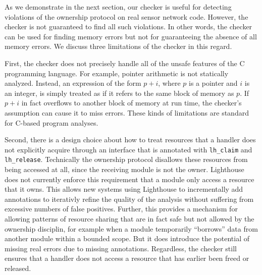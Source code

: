 As we demonstrate in the next section, our checker is useful for
detecting violations of the ownership protocol on real sensor network
code.  However, the checker is not guaranteed to find all such
violations.  In other words, the checker can be used for finding
memory errors but not for guaranteeing the absence of all memory
errors.  We discuss three limitations of the checker in this regard.

First, the checker does not precisely handle all of the unsafe
features of the C programming language.  For example, pointer
arithmetic is not statically analyzed.  Instead, an expression of the
form $p+i$, where $p$ is a pointer and $i$ is an integer, is simply
treated as if it refers to the same block of memory as $p$.  If $p+i$
in fact overflows to another block of memory at run time, the
checker's assumption can cause it to miss errors.  These kinds of
limitations are standard for C-based program analyses.

Second, there is a design choice about how to treat resources that a
handler does not explicitly acquire through an interface that is
annotated with {\tt lh\_claim} and {\tt lh\_release}.  Technically the
ownership protocol disallows these resources from being accessed at
all, since the receiving module is not the owner.  
%
Lighthouse does not currently enforce this requirement that a module
only access a resource that it owns.
% 
This allows new systems using Lighthouse to incrementally add
annotations to iterativly refine the quality of the analysis without
suffering from excessive numbers of false positives.
%
Further, this provides a mechanism for allowing patterns of resource
sharing that are in fact safe but not allowed by the ownership
disciplin, for example when a module temporarily ``borrows'' data from
another module within a bounded scope.
%
But it does introduce the potential of missing real errors due to
missing annotations.
%
Regardless, the checker still ensures that a handler does not access a
resource that has earlier been freed or released.


